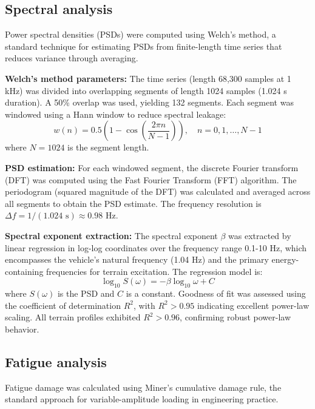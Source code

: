 \documentclass[11pt]{article}
\begin{document}
\subsection*{Spectral analysis}

Power spectral densities (PSDs) were computed using Welch's method\cite{Welch1967}, a standard technique for estimating PSDs from finite-length time series that reduces variance through averaging.

\textbf{Welch's method parameters:} The time series (length 68,300 samples at 1 kHz) was divided into overlapping segments of length 1024 samples (1.024 s duration). A 50\% overlap was used, yielding 132 segments. Each segment was windowed using a Hann window to reduce spectral leakage:
\begin{equation}
w(n) = 0.5\left(1 - \cos\left(\frac{2\pi n}{N-1}\right)\right), \quad n = 0, 1, \ldots, N-1
\end{equation}
where $N = 1024$ is the segment length.

\textbf{PSD estimation:} For each windowed segment, the discrete Fourier transform (DFT) was computed using the Fast Fourier Transform (FFT) algorithm. The periodogram (squared magnitude of the DFT) was calculated and averaged across all segments to obtain the PSD estimate. The frequency resolution is $\Delta f = 1/(1.024 \text{ s}) \approx 0.98$ Hz.

\textbf{Spectral exponent extraction:} The spectral exponent $\beta$ was extracted by linear regression in log-log coordinates over the frequency range 0.1-10 Hz, which encompasses the vehicle's natural frequency (1.04 Hz) and the primary energy-containing frequencies for terrain excitation. The regression model is:
\begin{equation}
\log_{10} S(\omega) = -\beta \log_{10} \omega + C
\end{equation}
where $S(\omega)$ is the PSD and $C$ is a constant. Goodness of fit was assessed using the coefficient of determination $R^2$, with $R^2 > 0.95$ indicating excellent power-law scaling. All terrain profiles exhibited $R^2 > 0.96$, confirming robust power-law behavior.

\subsection*{Fatigue analysis}

Fatigue damage was calculated using Miner's cumulative damage rule\cite{Miner1945}, the standard approach for variable-amplitude loading in engineering practice.
\end{document}
